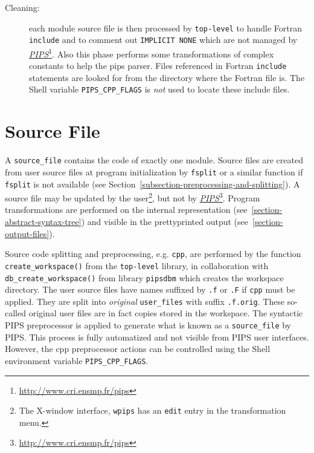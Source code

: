 \documentclass[a4paper]{report}
\newcommand{\LINK}[2]{\href{#2}{#1}\footnote{\url{#2}}\xspace}
\newcommand{\PIPS}{\LINK{\emph{PIPS}}{http://www.cri.ensmp.fr/pips}}
\begin{document}
\begin{description}

\item[Cleaning:] each module source file is then processed by
  \texttt{top-level} to handle Fortran \verb|include| and to comment out
  \texttt{IMPLICIT NONE} which are not managed by \PIPS{}. Also this phase
  performs some transformations of complex constants to help the pips
  parser. Files referenced in Fortran \texttt{include} statements are
  looked for from the directory where the Fortran file is.  The Shell
  variable \verb|PIPS_CPP_FLAGS| is {\em not} used to locate these include
  files.

\end{description}

\section{Source File}
\label{subsection-source-file}

A \verb/source_file/ contains the code of exactly one module. Source files
are created from user source files at program initialization by
\texttt{fsplit} or a similar function if \texttt{fsplit} is not available (see
Section~\ref{subsection-preprocessing-and-splitting}).  A
source file may be updated by the user\footnote{The
  X-window interface, \texttt{wpips} has an \texttt{edit} entry in the
  transformation menu.}, but not by \PIPS{}. Program
transformations are performed on the internal representation
(see~\ref{section-abstract-syntax-tree}) and visible in the prettyprinted
output (see~\ref{section-output-files}).

Source code splitting and preprocessing, e.g. \texttt{cpp}, are performed
by the function \verb/create_workspace()/ from the \texttt{top-level} library,
in collaboration with \verb/db_create_workspace()/ from library
\texttt{pipsdbm} which creates the workspace directory. The user source
files have names suffixed by \texttt{.f} or \texttt{.F} if \texttt{cpp}
must be applied. They are split into {\em original} \verb/user_files/ with
suffix \texttt{.f.orig}. These so-called original user files are in fact
copies stored in the workspace. The syntactic PIPS preprocessor is
applied to generate what is known as a \verb/source_file/ by PIPS. This
process is fully automatized and not visible from PIPS user interfaces.
However, the cpp preprocessor actions can be controlled using the Shell
environment variable \verb/PIPS_CPP_FLAGS/.
\end{document}
